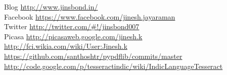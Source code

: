 Blog \url{http://www.jinsbond.in/} \\
Facebook \url{https://www.facebook.com/jinesh.jayaraman} \\
Twitter \url{http://twitter.com/#!/jinsbond007} \\
Picasa \url{http://picasaweb.google.com/jinesh.k} \\
\url{http://fci.wikia.com/wiki/User:Jinesh.k} \\
\url{https://github.com/santhoshtr/pypdflib/commits/master} \\
\url{http://code.google.com/p/tesseractindic/wiki/IndicLanguageTesseract} \\

\newpage
